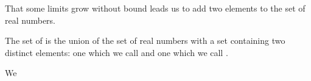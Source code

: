 
\sbasic







\sstart



That some limits grow
without bound leads us
to add two elements
to the set of real numbers.


The set of
is the union of
the set of real numbers
with a set containing
two distinct elements:
one which we call
and one which we call
.


We

\strats
